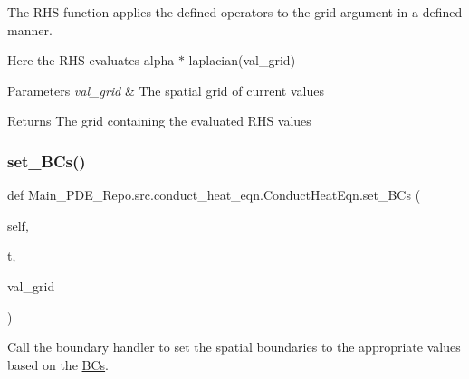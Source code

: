 The R\+HS function applies the defined operators to the grid argument in a defined manner. 

Here the R\+HS evaluates alpha $\ast$ laplacian(val\+\_\+grid) 
\begin{DoxyParams}{Parameters}
{\em val\+\_\+grid} & The spatial grid of current values \\
\hline
\end{DoxyParams}
\begin{DoxyReturn}{Returns}
The grid containing the evaluated R\+HS values 
\end{DoxyReturn}
\mbox{\label{classMain__PDE__Repo_1_1src_1_1conduct__heat__eqn_1_1ConductHeatEqn_ac8c71907fe7365902668c6785130c522}} 
\subsubsection{\texorpdfstring{set\+\_\+\+B\+Cs()}{set\_BCs()}}
{\footnotesize\ttfamily def Main\+\_\+\+P\+D\+E\+\_\+\+Repo.\+src.\+conduct\+\_\+heat\+\_\+eqn.\+Conduct\+Heat\+Eqn.\+set\+\_\+\+B\+Cs (\begin{DoxyParamCaption}\item[{}]{self,  }\item[{}]{t,  }\item[{}]{val\+\_\+grid }\end{DoxyParamCaption})}



Call the boundary handler to set the spatial boundaries to the appropriate values based on the \hyperlink{namespaceMain__PDE__Repo_1_1src_1_1BCs}{B\+Cs}. 


